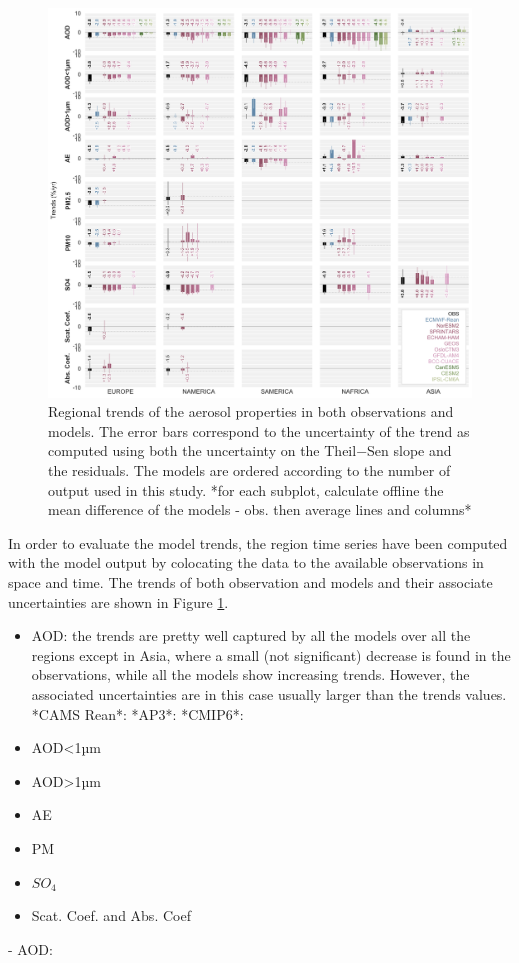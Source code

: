 \documentclass[journal abbreviation, manuscript]{copernicus}
\begin{document}
\begin{figure}[t]
 \includegraphics[width=16cm]{../scripts/figs/heatmaps/BARS.png}
 \caption{Regional trends of the aerosol properties in both observations and models. The error bars correspond to the uncertainty of the trend as computed using both the uncertainty on the Theil−Sen slope and the residuals. The models are ordered according to the number of output used in this study. *for each subplot, calculate offline the mean difference of the models - obs. then average lines and columns*}
 \label{fig:bars}
\end{figure}

In order to evaluate the model trends, the region time series have been computed with the model output by colocating the data to the available observations in space and time. The trends of both observation and models and their associate uncertainties are shown in Figure \ref{fig:bars}.

\begin{itemize}
    \item AOD: the trends are pretty well captured by all the models over all the regions except in Asia, where a small (not significant) decrease is found in the observations, while all the models show increasing trends. However, the associated uncertainties are in this case usually larger than the trends values.
    *CAMS Rean*: 
    *AP3*:
    *CMIP6*: 
    
    \item AOD<1µm
    \item AOD>1µm
    \item AE
    \item PM
    \item $SO_{4}$
    \item Scat. Coef. and Abs. Coef
\end{itemize}
- AOD: 
\end{document}
